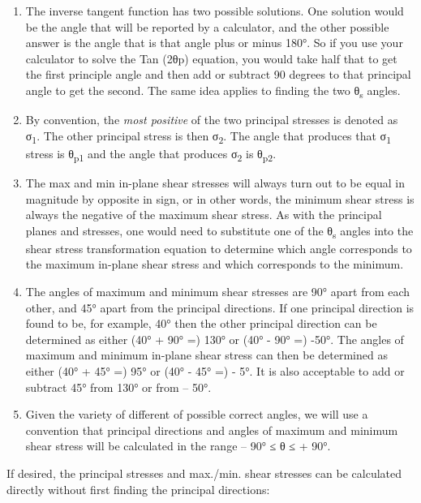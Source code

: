 \documentclass[
  letterpaper,
  DIV=11,
  numbers=noendperiod]{scrreprt}
\begin{document}
\begin{enumerate}
\def\labelenumi{\arabic{enumi}.}
\item
  The inverse tangent function has two possible solutions. One solution
  would be the angle that will be reported by a calculator, and the
  other possible answer is the angle that is that angle plus or minus
  180°. So if you use your calculator to solve the Tan (2θp) equation,
  you would take half that to get the first principle angle and then add
  or subtract 90 degrees to that principal angle to get the second. The
  same idea applies to finding the two θ\textsubscript{s} angles.
\item
  By convention, the \emph{most positive} of the two principal stresses
  is denoted as σ\textsubscript{1}. The other principal stress is then
  σ\textsubscript{2}. The angle that produces that σ\textsubscript{1}
  stress is θ\textsubscript{p1} and the angle that produces
  σ\textsubscript{2} is θ\textsubscript{p2}.
\item
  The max and min in-plane shear stresses will always turn out to be
  equal in magnitude by opposite in sign, or in other words, the minimum
  shear stress is always the negative of the maximum shear stress. As
  with the principal planes and stresses, one would need to substitute
  one of the θ\textsubscript{s} angles into the shear stress
  transformation equation to determine which angle corresponds to the
  maximum in-plane shear stress and which corresponds to the minimum.
\item
  The angles of maximum and minimum shear stresses are 90° apart from
  each other, and 45° apart from the principal directions. If one
  principal direction is found to be, for example, 40° then the other
  principal direction can be determined as either (40° + 90° =) 130° or
  (40° - 90° =) -50°. The angles of maximum and minimum in-plane shear
  stress can then be determined as either (40° + 45° =) 95° or (40° -
  45° =) - 5°. It is also acceptable to add or subtract 45° from 130° or
  from -- 50°.
\item
  Given the variety of different of possible correct angles, we will use
  a convention that principal directions and angles of maximum and
  minimum shear stress will be calculated in the range -- 90° ≤ θ ≤ +
  90°.
\end{enumerate}

If desired, the principal stresses and max./min. shear stresses can be
calculated directly without first finding the principal directions:
\end{document}
